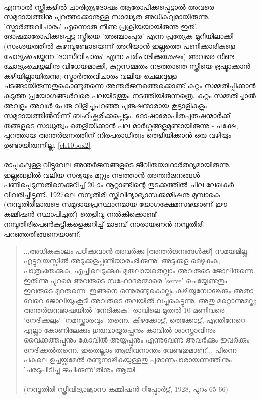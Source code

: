 \paragraph{}എന്നാൽ സ്ത്രീകളിൽ ചാരിത്ര്യദോഷം ആരോപിക്കപ്പെട്ടാൽ അവരെ സമുദായത്തിനു പുറത്താക്കാനുള്ള സാദ്ധ്യത അധികവുമായിരുന്നു. 'സ്മാർത്തവിചാരം' എന്നൊരു നീണ്ട പ്രക്രിയയായിരുന്നു ഇത്. ദോഷമാരോപിക്കപ്പെട്ട സ്ത്രീയെ 'അഞ്ചാംപുര' എന്ന പ്രത്യേക മുറിയിലാക്കി (സംശയത്തിൽ കഴമ്പുണ്ടോയെന്ന് അറിയാൻ ഇല്ലത്തെ പണിക്കാരികളെ ചോദ്യംചെയ്യുന്ന 'ദാസീവിചാരം' എന്ന പരിപാടിക്കുശേഷം) അവരെ നീണ്ട ചോദ്യംചെയ്യലിനു വിധേയമാക്കി, കുറ്റസമ്മതം നടത്താതെ സ്ത്രീയെ ഭ്രഷ്ടാക്കാൻ കഴിയില്ലായിരുന്നു; സ്മാർത്തവിചാരം വലിയ ചെലവുള്ള ചടങ്ങായിരുന്നതുകൊണ്ടുതന്നെ അന്തർജനത്തെക്കൊണ്ട് കുറ്റം സമ്മതിപ്പിക്കാൻ കടുത്ത പ്രയോഗങ്ങൾവരെ പലയിടത്തും നടത്തിയിരുന്നത്രെ. കുറ്റം സമ്മതിച്ചാൽ അവളും അവൾ പേരു വിളിച്ചുപറഞ്ഞ പുരുഷന്മാരായ കൂട്ടാളികളും സമുദായത്തിൽനിന്ന് ബഹിഷ്ക്കരിക്കപ്പെടും. ദോഷാരോപിതപുരുഷന്മാർക്ക് തങ്ങളുടെ സാധുത്വം തെളിയിക്കാൻ പല മാർഗ്ഗങ്ങളുമുണ്ടായിരുന്നു - പക്ഷേ, പുറത്തായ അന്തർജനത്തിന് നിരപരാധിത്വം തെളിയിക്കാൻ ഒരു വഴിയും ഉണ്ടായിരുന്നില്ല. \ref{ch10box2}

\paragraph{}രാപ്പകലുള്ള വീട്ടുവേല അന്തർജനങ്ങളുടെ ജീവിതയാഥാർത്ഥ്യമായിരുന്നു. ഇല്ലങ്ങളിൽ വലിയ സദ്യയും മറ്റും നടത്താൻ അന്തർജനങ്ങൾ പണിപ്പെടുന്നതിനെക്കുറിച്ച് 20-ാം നൂറ്റാണ്ടിന്റെ തുടക്കത്തിൽ ചില ലേഖകർ വിവരിച്ചിട്ടുണ്ട്. 1927ലെ നമ്പൂതിരി സ്ത്രീവിദ്യാഭ്യാസക്കമ്മിഷനു മുമ്പാകെ (നമ്പൂതിരിമാരുടെ സമുദായപ്രസ്ഥാനമായ യോഗക്ഷേമസഭയാണ് ഈ കമ്മിഷൻ സ്ഥാപിച്ചത്) തെളിവു നൽകിക്കൊണ്ട് നമ്പൂതിരിപെൺകുട്ടികളെക്കുറിച്ച് മാടമ്പ് നാരായണൻ നമ്പൂതിരി പറഞ്ഞതിങ്ങനെയാണ്:
\begin{quotation}
\noindent ...അധികകാലം പഠിക്കുവാൻ അവർക്കു [അന്തർജനങ്ങൾക്ക്] സമയമില്ല. എട്ടുവയസ്സിൽ അടുക്കളപ്പണിയാരംഭിക്കുന്നു! അടുക്കള മെഴുകുക, പാത്രംതേക്കുക, എച്ചിലെടുക്കുക മുതലായതെല്ലാം അവരുടെ ജോലിതന്നെ. ഇതിന്നു പുറമെ അവരുടെ സഹോദരന്മാരെ 'serve' ചെയ്യേണ്ടതും ഇവരുടെ മുറതന്നെ. ഇങ്ങനെ ഒന്നുരണ്ടുകൊല്ലം കഴിയുമ്പോഴേക്കും അതാ വേറെ ജോലിയുംകൂടി അവരുടെ തലയിൽ വച്ചുകെട്ടുന്നു. അതു മറ്റൊന്നുമല്ല; അന്തർജനഭാഷയിൽ 'നേദിക്കുക'. രാവിലെ മുതൽ 10 മണിവരെ 'നേദിക്കലും' 'നമസ്ക്കാരവും' തന്നെ. കിഴക്കോട്ട്, തെക്കോട്ട്, എന്തിനേറെ എല്ലാ കോണിലേക്കും ഗുരുവായൂരപ്പനും കാവിൽ ശാസ്താവിനും വൈക്കത്തപ്പനും കോവിൽ അയ്യപ്പനും എന്നുവേണ്ട അവർക്കും ഇവർക്കും നേദിക്കൽതന്നെ. ഇതെല്ലാം ആജീവനാന്തം വേണ്ടതുമാണ്... പിന്നെ പകലെ ഉച്ചയ്ക്കുമേൽ രണ്ടുനാഴികയുള്ളതു പുരാണപാരായണത്തിനും 'ചരടുപിടിച്ചു ജപിക്കുന്ന'തിനും ആയി. \\
\\(നമ്പൂതിരി സ്ത്രീവിദ്യാഭ്യാസ കമ്മിഷൻ റിപ്പോർട്ട്, 1928, പുറം 65-66)
\end{quotation}

